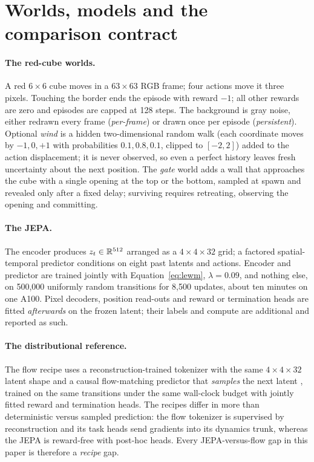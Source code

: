 \section{Worlds, models and the comparison contract}
\label{sec:worlds}

\paragraph{The red-cube worlds.}
A red $6\times6$ cube moves in a $63\times63$ RGB frame; four actions move it three pixels.
Touching the border ends the episode with reward $-1$; all other rewards are zero and episodes are
capped at 128 steps. The background is gray noise, either redrawn every frame (\emph{per-frame})
or drawn once per episode (\emph{persistent}). Optional \emph{wind} is a hidden two-dimensional
random walk (each coordinate moves by $-1,0,+1$ with probabilities $0.1,0.8,0.1$, clipped to
$[-2,2]$) added to the action displacement; it is never observed, so even a perfect history leaves
fresh uncertainty about the next position. The \emph{gate} world adds a wall that approaches the
cube with a single opening at the top or the bottom, sampled at spawn and revealed only after a
fixed delay; surviving requires retreating, observing the opening and committing.

\paragraph{The JEPA.}
The encoder produces $z_t\in\mathbb{R}^{512}$ arranged as a $4\times4\times32$ grid; a factored
spatial-temporal predictor conditions on eight past latents and actions. Encoder and predictor are
trained jointly with Equation~\ref{eq:lewm}, $\lambda=0.09$, and nothing else, on 500,000
uniformly random transitions for 8,500 updates, about ten minutes on one A100. Pixel decoders,
position read-outs and reward or termination heads are fitted \emph{afterwards} on the frozen
latent; their labels and compute are additional and reported as such.

\paragraph{The distributional reference.}
The flow recipe uses a reconstruction-trained tokenizer with the same $4\times4\times32$ latent
shape and a causal flow-matching predictor that \emph{samples} the next latent
\citep{lipman2023flowmatching,hafner2025dreamer4}, trained on the same transitions under the same
wall-clock budget with jointly fitted reward and termination heads. The recipes differ in more than
deterministic versus sampled prediction: the flow tokenizer is supervised by reconstruction and its
task heads send gradients into its dynamics trunk, whereas the JEPA is reward-free with post-hoc
heads. Every JEPA-versus-flow gap in this paper is therefore a \emph{recipe} gap.

